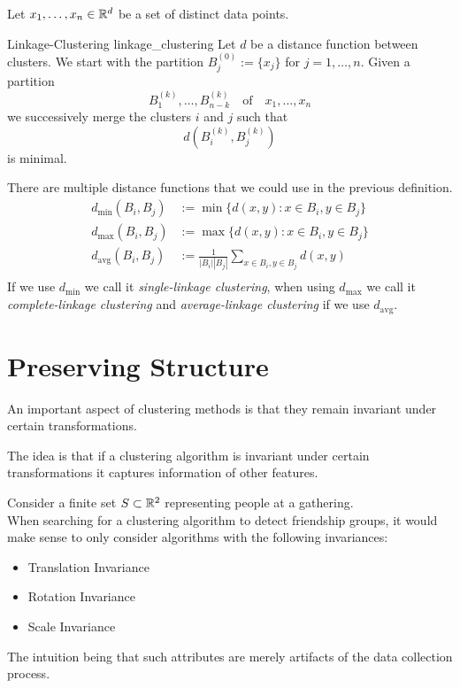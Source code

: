 Let $x_1, \dots, x_n \in \mathbb R^d$ be a set of distinct data points.
\begin{definition}{Linkage-Clustering }{linkage_clustering}
Let $d$ be a distance function between clusters. We start with the partition $B^{(0)}_j := \{x_j\}$ for $j = 1, \dots, n$.
Given a partition
$$
B^{(k)}_1, \dots, B^{(k)}_{n - k} \quad \text{of} \quad x_1, \dots, x_n
$$
we successively merge the clusters $i$ and $j$ such that
$$
d(B^{(k)}_i,B^{(k)}_j)
$$
is minimal.
\end{definition}

There are multiple distance functions that we could use in the previous definition.
\begin{align*}
d_\mathrm{min} (B_i, B_j) &:= \min\{d(x,y): x \in B_i, y \in B_j\}\\
d_\mathrm{max} (B_i, B_j) &:= \max\{d(x,y): x \in B_i, y \in B_j\}\\
d_\mathrm{avg}(B_i,B_j) &:= \frac{1}{|B_i||B_j|} \sum_{x \in B_i, y \in B_j} d(x,y)\\
\end{align*}
If we use $d_\mathrm{min}$ we call it \emph{single-linkage clustering}, when using $d_\mathrm{max}$ we call it \emph{complete-linkage clustering} and \emph{average-linkage clustering} if we use $d_\mathrm{avg}$.

\section{Preserving Structure}
An important aspect of clustering methods is that they remain invariant under certain transformations.

The idea is that if a clustering algorithm is invariant under certain transformations it captures information of other features.

\begin{example}{}{}
Consider a finite set $S \subset \mathbb R^2$ representing people at a gathering.\\

When searching for a clustering algorithm to detect friendship groups, it would make sense to only consider algorithms with the following invariances:
\begin{itemize}
    \item Translation Invariance
    \item Rotation Invariance
    \item Scale Invariance
\end{itemize}
The intuition being that such attributes are merely artifacts of the data collection process.
\end{example}

